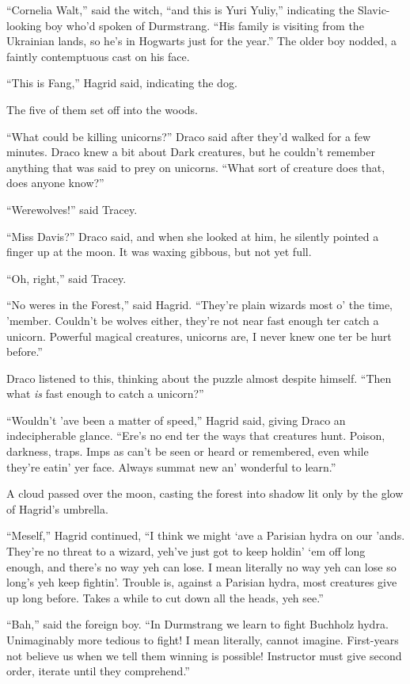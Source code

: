 ``Cornelia Walt,'' said the witch, ``and this is Yuri Yuliy,'' indicating the Slavic-looking boy who'd spoken of Durmstrang. ``His family is visiting from the Ukrainian lands, so he's in Hogwarts just for the year.'' The older boy nodded, a faintly contemptuous cast on his face.

``This is Fang,'' Hagrid said, indicating the dog.

The five of them set off into the woods.

``What could be killing unicorns?'' Draco said after they'd walked for a few minutes. Draco knew a bit about Dark creatures, but he couldn't remember anything that was said to prey on unicorns. ``What sort of creature does that, does anyone know?''

``Werewolves!'' said Tracey.

``Miss Davis?'' Draco said, and when she looked at him, he silently pointed a finger up at the moon. It was waxing gibbous, but not yet full.

``Oh, right,'' said Tracey.

``No weres in the Forest,'' said Hagrid. ``They're plain wizards most o' the time, 'member. Couldn't be wolves either, they're not near fast enough ter catch a unicorn. Powerful magical creatures, unicorns are, I never knew one ter be hurt before.''

Draco listened to this, thinking about the puzzle almost despite himself. ``Then what \emph{is} fast enough to catch a unicorn?''

``Wouldn't 'ave been a matter of speed,'' Hagrid said, giving Draco an indecipherable glance. ``Ere's no end ter the ways that creatures hunt. Poison, darkness, traps. Imps as can't be seen or heard or remembered, even while they're eatin' yer face. Always summat new an' wonderful to learn.''

A cloud passed over the moon, casting the forest into shadow lit only by the glow of Hagrid's umbrella.

``Meself,'' Hagrid continued, ``I think we might `ave a Parisian hydra on our 'ands. They're no threat to a wizard, yeh've just got to keep holdin' `em off long enough, and there's no way yeh can lose. I mean literally no way yeh can lose so long's yeh keep fightin'. Trouble is, against a Parisian hydra, most creatures give up long before. Takes a while to cut down all the heads, yeh see.''

``Bah,'' said the foreign boy. ``In Durmstrang we learn to fight Buchholz hydra. Unimaginably more tedious to fight! I mean literally, cannot imagine. First-years not believe us when we tell them winning is possible! Instructor must give second order, iterate until they comprehend.''

